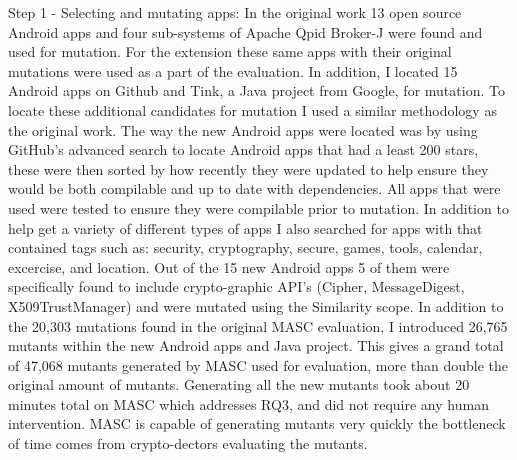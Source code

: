 Step 1 - Selecting and mutating apps: In the original work 13 open source Android apps and four sub-systems of Apache Qpid Broker-J were found and used for mutation. For the extension these same apps with their original mutations were used as a part of the evaluation. In addition, I located 15 Android apps on Github and Tink, a Java project from Google, for mutation. To locate these additional candidates for mutation I used a similar methodology as the original work. The way the new Android apps were located was by using GitHub's advanced search to locate Android apps that had a least 200 stars, these were then sorted by how recently they were updated to help ensure they would be both compilable and up to date with dependencies. All apps that were used were tested to ensure they were compilable prior to mutation. In addition to help get a variety of different types of apps I also searched for apps with that contained tags such as: security, cryptography, secure, games, tools, calendar, excercise, and location. Out of the 15 new Android apps 5 of them were specifically found to include crypto-graphic API's (Cipher, MessageDigest, X509TrustManager) and were mutated using the Similarity scope. In addition to the 20,303 mutations found in the original MASC evaluation, I introduced 26,765 mutants within the new Android apps and Java project. This gives a grand total of 47,068 mutants generated by MASC used for evaluation, more than double the original amount of mutants. Generating all the new mutants took about 20 minutes total on MASC which addresses RQ3, and did not require any human intervention. MASC is capable of generating mutants very quickly the bottleneck of time comes from crypto-dectors evaluating the mutants.
